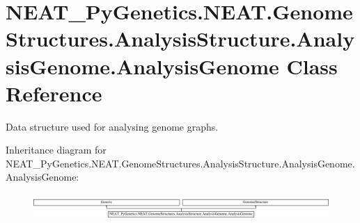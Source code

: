 \hypertarget{classNEAT__PyGenetics_1_1NEAT_1_1GenomeStructures_1_1AnalysisStructure_1_1AnalysisGenome_1_1AnalysisGenome}{}\section{N\+E\+A\+T\+\_\+\+Py\+Genetics.\+N\+E\+A\+T.\+Genome\+Structures.\+Analysis\+Structure.\+Analysis\+Genome.\+Analysis\+Genome Class Reference}
\label{classNEAT__PyGenetics_1_1NEAT_1_1GenomeStructures_1_1AnalysisStructure_1_1AnalysisGenome_1_1AnalysisGenome}


Data structure used for analysing genome graphs.  


Inheritance diagram for N\+E\+A\+T\+\_\+\+Py\+Genetics.\+N\+E\+A\+T.\+Genome\+Structures.\+Analysis\+Structure.\+Analysis\+Genome.\+Analysis\+Genome\+:\begin{figure}[H]
\begin{center}
\leavevmode
\includegraphics[height=0.984183cm]{classNEAT__PyGenetics_1_1NEAT_1_1GenomeStructures_1_1AnalysisStructure_1_1AnalysisGenome_1_1AnalysisGenome}
\end{center}
\end{figure}
